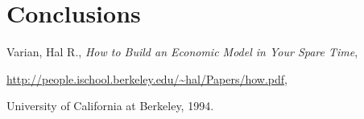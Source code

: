 \documentclass[11pt]{article}
\begin{document}
\section{Conclusions}




\begin{thebibliography}{99}
Varian, Hal R., \emph{How to Build an Economic Model in Your Spare Time},
\begin{small}\url{http://people.ischool.berkeley.edu/\~hal/Papers/how.pdf},\end{small}
University of California at Berkeley,
1994.


\end{thebibliography}
\end{document}
